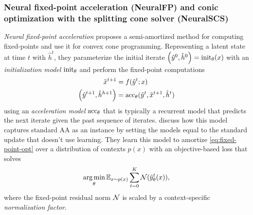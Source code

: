 \documentclass[twoside,11pt]{article}
\begin{document}
\subsubsection{Neural fixed-point acceleration (NeuralFP) and conic optimization with the splitting cone solver (NeuralSCS)}
\label{sec:apps:neural-fp}
\emph{Neural fixed-point acceleration} \citep{venkataraman2021neural}
proposes a semi-amortized method for computing fixed-points
and use it for convex cone programming.
Representing a latent state at time $t$ with $\hat h^t$,
they parameterize the initial iterate
$\left(\hat y^0, \hat h^0\right) = {\rm init}_\theta(x)$
with an \emph{initialization model} ${\rm init_\theta}$
and perform the fixed-point computations
\begin{equation}
  \begin{aligned}
    \tilde x^{t+1} &= f(\hat y^t; x) \\
    \left(\hat y^{t+1},\hat h^{h+1}\right) &= {\rm acc}_\theta(\hat y^t, \tilde x^{t+1}, \hat h^t)
  \end{aligned}
  \label{eq:neural-fp}
\end{equation}
using an \emph{acceleration model} ${\rm acc_\theta}$
that is typically a recurrent model that predicts the
next iterate given the past sequence of iterates.
\citet[Prop. 1]{venkataraman2021neural} discuss how
this model captures standard AA as an instance
by setting the models equal to the standard update
that doesn't use learning.
They learn this model to amortize \cref{eq:fixed-point-opt}
over a distribution of contexts $p(x)$ with an objective-based loss
that solves
\begin{equation}
  \operatorname*{arg\,min}_\theta \operatorname{\mathbb{E}}_{x\sim p(x)} \sum_{t=0}^K {\mathcal{N}}(\hat y^t_\theta(x)),
  \label{eq:neural-fp-loss}
\end{equation}
where the fixed-point residual norm ${\mathcal{N}}$ is scaled by a
context-specific \emph{normalization factor}.
\end{document}
